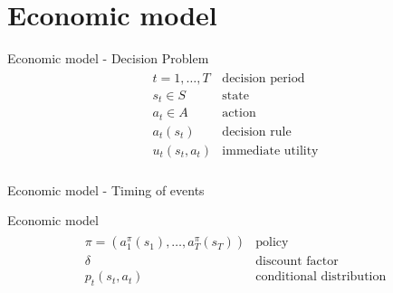 \section{Economic model}
\begin{frame}{Economic model - Decision Problem}
\begin{align*}\begin{array}{ll}
t = 1, \hdots, T& \text{decision period} \\[0.5em]
s_t\in S & \text{state}  \\[0.5em]
a_t\in A & \text{action} \\[0.5em]
a_t(s_t) & \text{decision rule} \\[0.5em]
u_t(s_t, a_t) & \text{immediate utility}\\[0.5em]
\end{array}\end{align*}
\end{frame}
\begin{frame}{Economic model - Timing of events}
\vspace{1.5cm}
\scalebox{0.9}{\hspace{-0.2cm}}
\end{frame}
\begin{frame}{Economic model}
\begin{align*}\begin{array}{ll}
\pi = (a^\pi_1(s_1), \hdots, a^\pi_T(s_T)) & \text{policy}\\[0.5em]
\delta & \text{discount factor} \\[0.5em]
p_t(s_t, a_t) & \text{conditional distribution}
\end{array}\end{align*}
\end{frame}

